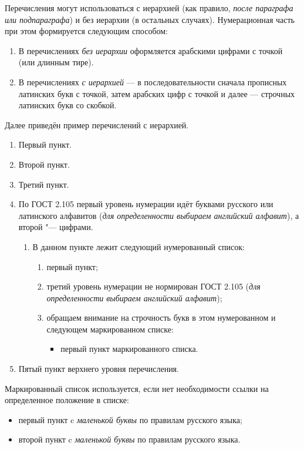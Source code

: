 Перечисления могут использоваться с иерархией (как правило, {\itshape после параграфа или подпараграфа}) и без иерархии (в остальных случаях). Нумерационная часть при этом формируется следующим способом:

\begin{enumerate}[1.]
	\item В перечислениях {\itshape без иерархии} оформляется арабскими цифрами с точкой (или длинным тире).
	\item В перечислениях {\itshape с иерархией} --- в последовательности сначала прописных латинских букв с точкой, затем арабских цифр с точкой и далее --- строчных латинских букв со скобкой. 
\end{enumerate}





Далее приведён пример перечислений с иерархией.


\begin{enumerate}
	\item Первый пункт.
	\item Второй пункт.
	\item Третий пункт.
	\item По ГОСТ 2.105 первый уровень нумерации идёт буквами русского или латинского алфавитов ({\itshape для определенности выбираем английский алфавит}),
	а второй "--- цифрами. 
	\begin{enumerate}
		\item В данном пункте лежит следующий нумерованный список: 
		\begin{enumerate}
			\item первый пункт;
			\item третий уровень нумерации не нормирован ГОСТ 2.105 ({\itshape для определенности выбираем английский алфавит});
			\item обращаем внимание на строчность букв в этом нумерованном и следующем маркированном списке:
			\begin{itemize}
				\item первый пункт маркированного списка.
			\end{itemize}    
		\end{enumerate}
	\end{enumerate}
	\item Пятый пункт верхнего уровня перечисления.
\end{enumerate}

Маркированный список используется, если нет необходимости ссылки на определенное положение в списке:
\begin{itemize}
	\item первый пункт c {\itshape маленькой буквы} по правилам русского языка;
	\item второй пункт c {\itshape маленькой буквы} по правилам русского языка.
\end{itemize}